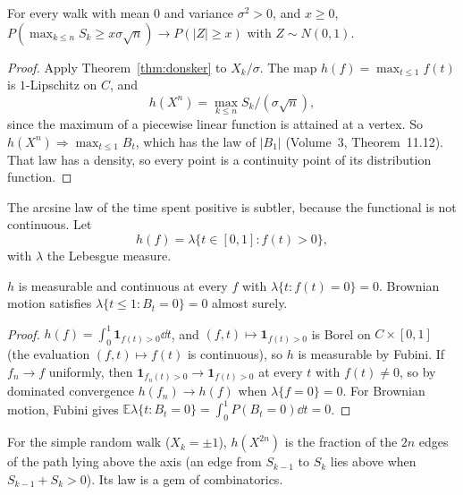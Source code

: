 \begin{corollary}\label{cor:max}
For every walk with mean $0$ and variance $\sigma^2>0$, and $x\ge0$, $P(\max_{k\le n}S_k\ge x\sigma\sqrt n)\to P(|Z|\ge x)$ with $Z\sim N(0,1)$.
\end{corollary}
\begin{proof}
Apply Theorem~\ref{thm:donsker} to $X_k/\sigma$. The map $h(f)=\max_{t\le1}f(t)$ is $1$-Lipschitz on $C$, and
\[
h(X^n)=\max_{k\le n}S_k/(\sigma\sqrt n),
\]
since the maximum of a piecewise linear function is attained at a vertex. So $h(X^n)\Rightarrow\max_{t\le1}B_t$, which has the law of $|B_1|$ (Volume~3, Theorem~11.12). That law has a
density, so every point is a continuity point of its distribution function.
\end{proof}

The arcsine law of the time spent positive is subtler, because the functional is not continuous. Let
\[
h(f)=\lambda\{t\in[0,1]:f(t)>0\},
\]
with $\lambda$ the Lebesgue measure.

\begin{lemma}\label{lem:occupcont}
$h$ is measurable and continuous at every $f$ with $\lambda\{t:f(t)=0\}=0$. Brownian motion satisfies $\lambda\{t\le1:B_t=0\}=0$ almost surely.
\end{lemma}
\begin{proof}
$h(f)=\int_0^1\mathbf 1_{f(t)>0}\dd t$, and $(f,t)\mapsto\mathbf 1_{f(t)>0}$ is Borel on $C\times[0,1]$ (the evaluation $(f,t)\mapsto f(t)$ is continuous), so $h$ is measurable by Fubini. If
$f_n\to f$ uniformly, then $\mathbf 1_{f_n(t)>0}\to\mathbf 1_{f(t)>0}$ at every $t$ with $f(t)\ne0$, so by dominated convergence $h(f_n)\to h(f)$ when $\lambda\{f=0\}=0$. For Brownian
motion, Fubini gives $\mathbb E\lambda\{t:B_t=0\}=\int_0^1P(B_t=0)\dd t=0$.
\end{proof}

For the simple random walk ($X_k=\pm1$), $h(X^{2n})$ is the fraction of the $2n$ edges of the path lying above the axis (an edge from $S_{k-1}$ to $S_k$ lies above
when $S_{k-1}+S_k>0$). Its law is a gem of combinatorics.

